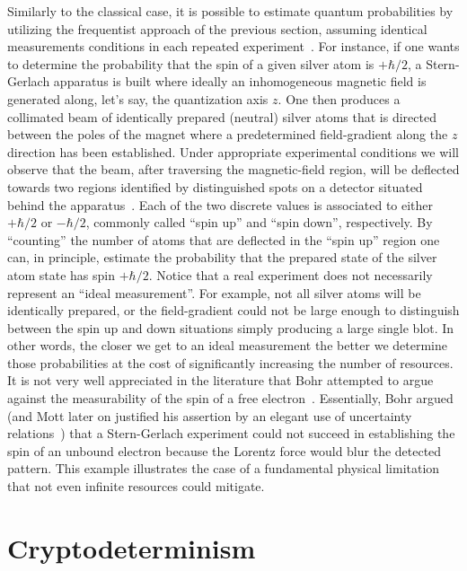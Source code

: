 \documentclass[12pt]{iopart}
\theoremstyle{plain}
\theoremstyle{definition}
\theoremstyle{remark}
\begin{document}
Similarly to the classical case, it is possible to estimate quantum
probabilities by utilizing the frequentist approach of the previous
section, assuming identical measurements conditions in each repeated
experiment~\cite{peres1995quantum}. For instance, if one wants to
determine the probability that the spin of a given silver atom is
$+\hbar/2$, a Stern-Gerlach apparatus is built where ideally an inhomogeneous
magnetic field is generated along, let's say, the quantization axis
$z$. One then produces a collimated beam of identically prepared
(neutral) silver atoms that is directed between the poles of the magnet
where a predetermined field-gradient along the $z$ direction has
been established. Under appropriate experimental conditions we will
observe that the beam, after traversing the magnetic-field region,
will be deflected towards two regions identified by distinguished
spots on a detector situated behind the apparatus~\cite{Stern1988,peres1995quantum,544199,Griffiths2003}.
Each of the two discrete values is associated to either $+\hbar/2$
or $-\hbar/2$, commonly called ``spin up'' and ``spin down'',
respectively. By ``counting'' the number of atoms that are deflected
in the ``spin up'' region one can, in principle, estimate the probability
that the prepared state of the silver atom state has spin $+\hbar/2$.
Notice that a real experiment does not necessarily represent an ``ideal
measurement''. For example, not all silver atoms will be identically
prepared, or the field-gradient could not be large enough to distinguish
between the spin up and down situations simply producing a large single
blot. In other words, the closer we get to an ideal measurement the
better we determine those probabilities at the cost of significantly
increasing the number of resources. It is not very well appreciated
in the literature that Bohr attempted to argue against the measurability
of the spin of a free electron~\cite{Bohr1985,MartensDeMuynck1994,McEvoy2001}.
Essentially, Bohr argued (and Mott later on justified his assertion
by an elegant use of uncertainty relations~\cite{10.2307/j.ctt7ztxn5.15})
that a Stern-Gerlach experiment could not succeed in establishing
the spin of an unbound electron because the Lorentz force would blur
the detected pattern. This example illustrates the case of a fundamental
physical limitation that not even infinite resources could mitigate.



\section{Cryptodeterminism}
\end{document}
